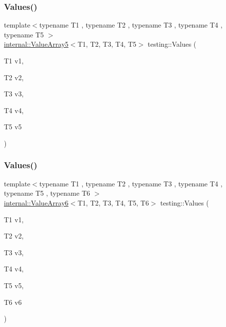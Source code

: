 \subsubsection{\texorpdfstring{Values()}{Values()}\hspace{0.1cm}{\footnotesize\ttfamily [6/51]}}
{\footnotesize\ttfamily template$<$typename T1 , typename T2 , typename T3 , typename T4 , typename T5 $>$ \\
\mbox{\hyperlink{classtesting_1_1internal_1_1_value_array5}{internal\+::\+Value\+Array5}}$<$T1, T2, T3, T4, T5$>$ testing\+::\+Values (\begin{DoxyParamCaption}\item[{T1}]{v1,  }\item[{T2}]{v2,  }\item[{T3}]{v3,  }\item[{T4}]{v4,  }\item[{T5}]{v5 }\end{DoxyParamCaption})}

\mbox{\label{namespacetesting_a552772c4c4daa68b5e995e0d64651150}} 
\subsubsection{\texorpdfstring{Values()}{Values()}\hspace{0.1cm}{\footnotesize\ttfamily [7/51]}}
{\footnotesize\ttfamily template$<$typename T1 , typename T2 , typename T3 , typename T4 , typename T5 , typename T6 $>$ \\
\mbox{\hyperlink{classtesting_1_1internal_1_1_value_array6}{internal\+::\+Value\+Array6}}$<$T1, T2, T3, T4, T5, T6$>$ testing\+::\+Values (\begin{DoxyParamCaption}\item[{T1}]{v1,  }\item[{T2}]{v2,  }\item[{T3}]{v3,  }\item[{T4}]{v4,  }\item[{T5}]{v5,  }\item[{T6}]{v6 }\end{DoxyParamCaption})}

\mbox{\label{namespacetesting_a8fe9ae088304ebc64de1b076951e6eb8}} 
